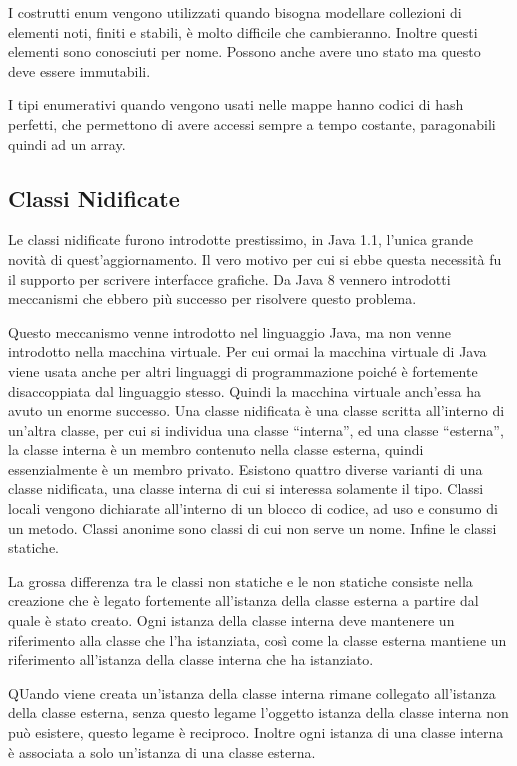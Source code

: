 \documentclass{article}
\numberwithin{equation}{subsection}
\begin{document}
I costrutti enum vengono utilizzati quando bisogna modellare collezioni di elementi noti, finiti e stabili, è molto difficile che cambieranno. Inoltre questi elementi sono conosciuti 
per nome. Possono anche avere uno stato ma questo deve essere immutabili. 

I tipi enumerativi quando vengono usati nelle mappe hanno codici di hash perfetti, che permettono di avere accessi sempre a tempo costante, paragonabili quindi ad un 
array. 

\subsection{Classi Nidificate}

Le classi nidificate furono introdotte prestissimo, in Java 1.1, l'unica grande novità di quest'aggiornamento. 
Il vero motivo per cui si ebbe questa necessità fu il supporto per scrivere interfacce grafiche. 
Da Java 8 vennero introdotti meccanismi che ebbero più successo per risolvere questo problema. 

Questo meccanismo venne introdotto nel linguaggio Java, ma non venne introdotto nella macchina virtuale. Per cui ormai la macchina virtuale di Java viene usata anche per 
altri linguaggi di programmazione poiché è fortemente disaccoppiata dal linguaggio stesso. Quindi la macchina virtuale anch'essa ha avuto un enorme successo. 
Una classe nidificata è una classe scritta all'interno di un'altra classe, per cui si individua una classe ``interna'', ed una classe ``esterna'', la classe interna è un 
membro contenuto nella classe esterna, quindi essenzialmente è un membro privato. 
Esistono quattro diverse varianti di una classe nidificata, una classe interna di cui si interessa solamente il tipo. 
Classi locali vengono dichiarate all'interno di un blocco di codice, ad uso e consumo di un metodo. 
Classi anonime sono classi di cui non serve un nome. 
Infine le classi statiche. 

La grossa differenza tra le classi non statiche e le non statiche consiste nella creazione che è legato fortemente all'istanza della classe esterna a partire dal quale è stato 
creato. Ogni istanza della classe interna deve mantenere un riferimento alla classe che l'ha istanziata, così come la classe esterna mantiene un riferimento all'istanza 
della classe interna che ha istanziato.  

QUando viene creata un'istanza della classe interna rimane collegato all'istanza della classe esterna, senza questo legame l'oggetto istanza della classe interna non può 
esistere, questo legame è reciproco. 
Inoltre ogni istanza di una classe interna è associata a solo un'istanza di una classe esterna.  
\end{document}
